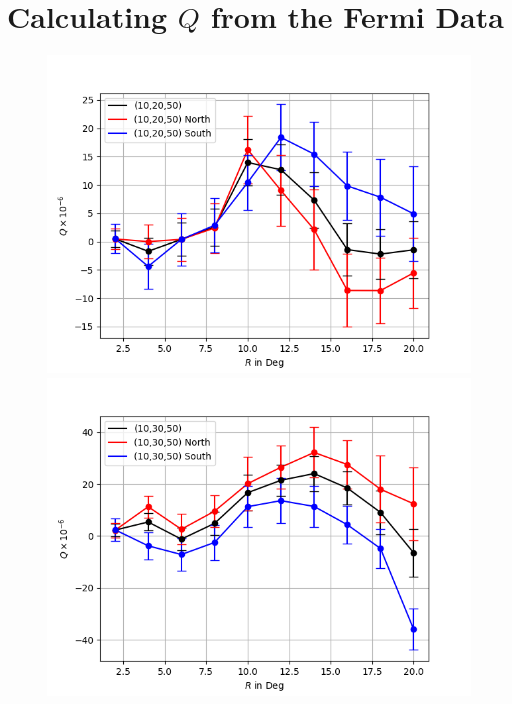 \documentclass[english]{article}
\begin{document}
\section{Calculating $Q$ from the Fermi Data}
\begin{figure}
	\centering
	\includegraphics[scale=0.5]{Qhemisphere_wk_100_400_10_20_50_scrubbed.png}\includegraphics[scale=0.5]{Qhemisphere_wk_100_400_10_30_50_scrubbed.png}


\end{figure}
\end{document}
